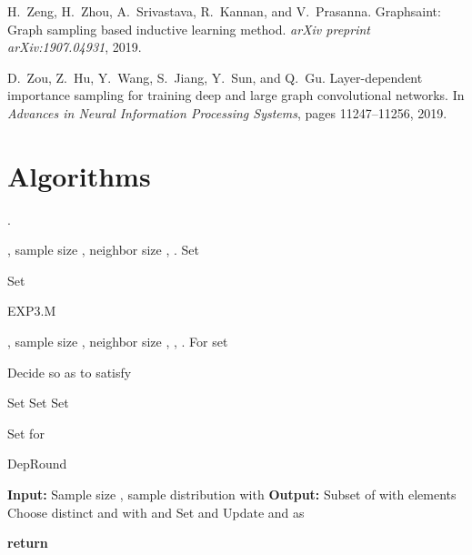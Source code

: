 \documentclass{article}
\begin{document}
\begin{thebibliography}{25}
H.~Zeng, H.~Zhou, A.~Srivastava, R.~Kannan, and V.~Prasanna.
\newblock Graphsaint: Graph sampling based inductive learning method.
\newblock \emph{arXiv preprint arXiv:1907.04931}, 2019.

D.~Zou, Z.~Hu, Y.~Wang, S.~Jiang, Y.~Sun, and Q.~Gu.
\newblock Layer-dependent importance sampling for training deep and large graph
  convolutional networks.
\newblock In \emph{Advances in Neural Information Processing Systems}, pages
  11247--11256, 2019.

\end{thebibliography}

\clearpage
\appendix


\section{Algorithms}\label{appendix:alg}
\begin{algorithm}
\caption{.}
\label{alg:exp3}
\begin{algorithmic}[1]
\Require , sample size , neighbor size , .
\State Set 
	
	
\State Set

\end{algorithmic}
\end{algorithm}

\begin{algorithm}[ht]
\caption{EXP3.M}
\label{alg:exp3m}
\begin{algorithmic}[1]
\Require , sample size , neighbor size , , .
	\State For  set
	
	
	\If {}
		\State Decide  so as to satisfy
		
		\State Set 
                \Else
		\State Set 
                \EndIf
	\State Set
		
	\State Set
		 for
		
\end{algorithmic}
\end{algorithm}

\begin{algorithm}
\caption{DepRound}
\label{alg:dep_round}
\begin{algorithmic}[1]
\State \textbf{Input:} Sample size , sample distribution  with 
\State \textbf{Output:} Subset of  with  elements
    \State Choose distinct  and  with  and 
    \State Set  and  
    \State Update  and  as
    
\EndWhile
\State \textbf{return} 
\end{algorithmic}
\end{algorithm}
\end{document}
